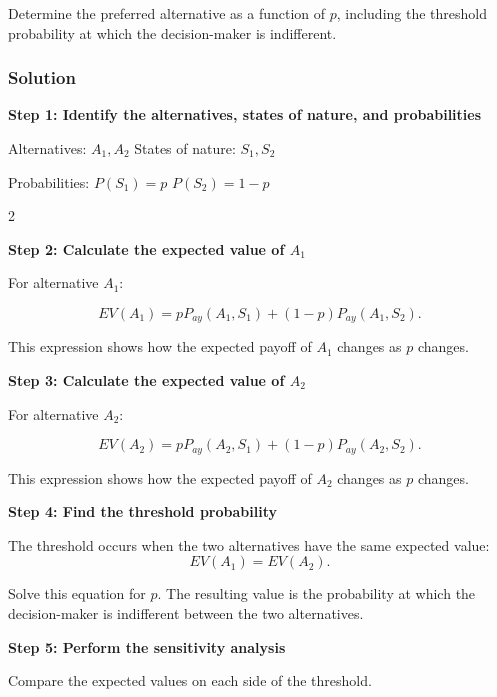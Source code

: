 	Determine the preferred alternative as a function of $p$, including the
	threshold probability at which the decision-maker is indifferent.

	\subsubsection{Solution}
	
	\textbf{Step 1: Identify the alternatives, states of nature, and probabilities}
	
	Alternatives: $A_1, A_2$ \qquad
	States of nature: $S_1, S_2$
	
	Probabilities: $P(S_1) = p$	\qquad	$P(S_2) = 1-p$
	
	\noindent
	\setlength{\columnseprule}{0.4pt}
	
	\begin{multicols}{2}
		\vspace{0pt}
		
		\textbf{Step 2: Calculate the expected value of $A_1$}
		
		For alternative $A_1$:
		
		\[
		EV(A_1)
		=
		pP_{ay}(A_1,S_1)
		+
		(1-p)P_{ay}(A_1,S_2).
		\]
		
		This expression shows how the expected payoff of $A_1$ changes as
		$p$ changes.
		
		\columnbreak
		
		\textbf{Step 3: Calculate the expected value of $A_2$}
		
		For alternative $A_2$:
		
		\[
		EV(A_2)
		=
		pP_{ay}(A_2,S_1)
		+
		(1-p)P_{ay}(A_2,S_2).
		\]
		
		This expression shows how the expected payoff of $A_2$ changes as
		$p$ changes.
		
	\end{multicols}
	
	\setlength{\columnseprule}{0pt}
	
	\textbf{Step 4: Find the threshold probability}
	
	The threshold occurs when the two alternatives have the same expected
	value:
	$$
	EV(A_1)=EV(A_2).
	$$
	
	Solve this equation for $p$. The resulting value is the probability at
	which the decision-maker is indifferent between the two alternatives.
	
	\textbf{Step 5: Perform the sensitivity analysis}
	
	Compare the expected values on each side of the threshold.
	
